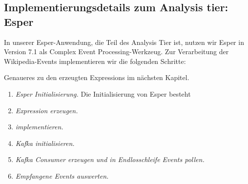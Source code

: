 \subsection{Implementierungsdetails zum Analysis tier: Esper}
In unserer Esper-Anwendung, die Teil des Analysis Tier ist, nutzen wir Esper in Version 7.1 als Complex Event Processing-Werkzeug. Zur Verarbeitung
der Wikipedia-Events implementieren wir die folgenden Schritte:

Genaueres zu den erzeugten Expressions im nächsten Kapitel.

\begin{enumerate}
    \item \textit{Esper Initialisierung.} Die Initialisierung von Esper besteht
    \item \textit{Expression erzeugen.}
    \item \textit{ implementieren.}
    \item \textit{Kafka initialisieren.}
    \item \textit{Kafka Consumer erzeugen und in Endlosschleife Events pollen.}
    \item \textit{Empfangene Events auswerten.}
\end{enumerate}
